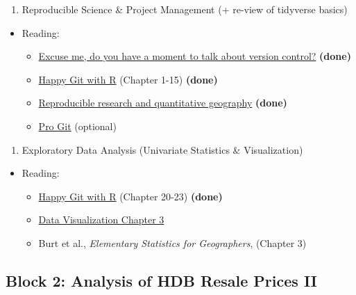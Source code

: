 \documentclass[]{book}
\providecommand{\tightlist}{%
  \setlength{\itemsep}{0pt}\setlength{\parskip}{0pt}}
\begin{document}
\begin{enumerate}
\def\labelenumi{\arabic{enumi}.}
\tightlist
\item
  Reproducible Science \& Project Management (+ re-view of tidyverse basics)
\end{enumerate}

\begin{itemize}
\tightlist
\item
  Reading:

  \begin{itemize}
  \tightlist
  \item
    \href{https://peerj.com/preprints/3159/}{Excuse me, do you have a moment to talk about version control?} \textbf{(done)}
  \item
    \href{https://happygitwithr.com}{Happy Git with R} (Chapter 1-15) \textbf{(done)}
  \item
    \href{https://journals.sagepub.com/doi/abs/10.1177/0309132515599625}{Reproducible research and quantitative geography} \textbf{(done)}
  \item
    \href{https://git-scm.com/book/en/v2}{Pro Git} (optional)
  \end{itemize}
\end{itemize}

\begin{enumerate}
\def\labelenumi{\arabic{enumi}.}
\setcounter{enumi}{1}
\tightlist
\item
  Exploratory Data Analysis (Univariate Statistics \& Visualization)
\end{enumerate}

\begin{itemize}
\tightlist
\item
  Reading:

  \begin{itemize}
  \tightlist
  \item
    \href{https://happygitwithr.com}{Happy Git with R} (Chapter 20-23) \textbf{(done)}
  \item
    \href{https://socviz.co/makeplot.html\#makeplot}{Data Visualization Chapter 3}
  \item
    Burt et al., \emph{Elementary Statistics for Geographers}, (Chapter 3)
  \end{itemize}
\end{itemize}

\hypertarget{block-2-analysis-of-hdb-resale-prices-ii}{%
\subsection{Block 2: Analysis of HDB Resale Prices II}\label{block-2-analysis-of-hdb-resale-prices-ii}}
\end{document}
